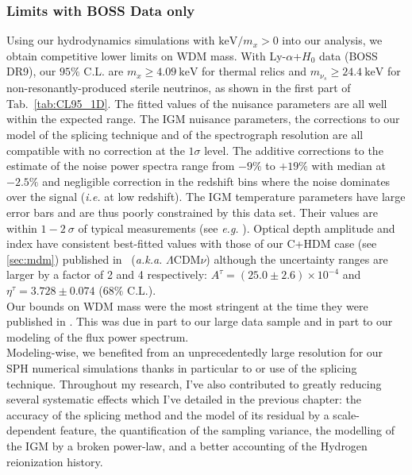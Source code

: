 \subsubsection{Limits with BOSS Data only}

Using our hydrodynamics simulations with $\mathrm{keV}/m_x > 0$ into our analysis, we obtain competitive lower limits on WDM mass. With Ly-$\alpha$+$H_0$ data (BOSS DR9), our $95\%$ C.L. are $m_x \geqslant 4.09~\mathrm{keV}$ for thermal relics and $m_{\nu_s} \geqslant 24.4 ~\mathrm{keV}$ for non-resonantly-produced sterile neutrinos, as shown in the first part of Tab.~\ref{tab:CL95_1D}. The fitted values of the nuisance parameters are all well within the expected range. The IGM nuisance parameters, the corrections to our model of the splicing technique and of the spectrograph resolution are all compatible with no correction at the $1\sigma$ level. The additive corrections to the estimate of the noise power spectra range from $-9\%$ to $+19\%$ with median at $-2.5\%$ and negligible correction in the redshift bins where the noise dominates over the signal (\textit{i.e.} at low redshift). The IGM temperature parameters have large error bars and are thus poorly constrained by this data set. Their values are within $1-2~\sigma$ of  typical  measurements (see \textit{e.g.} \cite{Becker2011}). Optical depth amplitude and index have consistent best-fitted values with those of our C+HDM case (see \ref{sec:mdm}) published in~\cite{Palanque2015b} (\textit{a.k.a.} $\Lambda$CDM$\nu$) although the uncertainty ranges are larger by a factor of 2 and 4 respectively: $A^\tau = \left( 25.0 \pm 2.6 \right) \times 10^{-4}$ and $\eta^\tau = 3.728 \pm 0.074$ ($68\%$ C.L.). \\

Our bounds on WDM mass were the most stringent at the time they were published in \cite{Baur16}. This was due in part to our large data sample and in part to our modeling of the flux power spectrum. \\
Modeling-wise, we benefited from an unprecedentedly large resolution for our SPH numerical simulations thanks in particular to or use of the splicing technique. Throughout my research, I've also contributed to greatly reducing several systematic effects which I've detailed in the previous chapter: the accuracy of the splicing method and the model of its residual by a scale-dependent  feature, the quantification of the sampling variance, the modelling of the IGM by a broken power-law, and a better accounting of the Hydrogen reionization history.  \\

